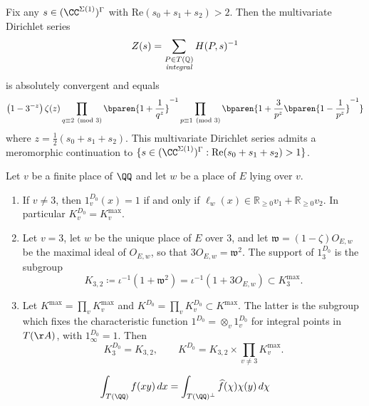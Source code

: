 \begin{theorem}\label{thm:heightZetaFunctionFormula2} Fix any $s \in (\CC^{\Sigma(1)})^{\Gamma}$ with $\mathrm{Re}(s_0+s_1+s_2) > 2$. Then the multivariate Dirichlet series \begin{equation} Z(s)= \sum_{\substack{P \in T(\mathbb Q)\\\text{\emph{integral}}}} H(P,s)^{-1} \end{equation} is absolutely convergent and equals \begin{align} \left({1-3^{-z}}\right) \zeta(z) \prod_{q\equiv2\pmod{3}} \bparen{1+\frac{1}{q^{z}}}^{-1} \prod_{p\equiv1\pmod{3}} \bparen{1+\frac{3}{p^z}\bparen{1-\frac{1}{p^z}}^{-1}} \end{align} where $z = \frac{1}{2}(s_0+s_1+s_2)$. This multivariate Dirichlet series admits a meromorphic continuation to $\{s \in (\CC^{\Sigma(1)})^{\Gamma} : \mathrm{Re}(s_0+s_1+s_2) > 1\}$. \end{theorem}

\begin{proposition}\label{prop:localIntegrality} Let $v$ be a finite place of $\QQ$ and let $w$ be a place of $E$ lying over $v$. \begin{enumerate} \item If $v \neq 3$, then $1_v^{D_0}(x) = 1$ if and only if $\ell_w(x) \in \mathbb R_{\geq 0}v_1+\mathbb R_{\geq 0}v_2$. In particular $K_v^{D_0}=K_v^{\mathrm{max}}$. \item Let $v = 3$, let $w$ be the unique place of $E$ over $3$, and let $\mathfrak w = (1-\zeta)O_{E,w}$ be the maximal ideal of $O_{E,w}$, so that $3O_{E,w} = \mathfrak w^2$. The support of $1_3^{D_0}$ is the subgroup \begin{equation} K_{3,2}\coloneqq\iota^{-1}(1+\mathfrak w^2) =\iota^{-1}(1+3O_{E,w})\subset K_3^{\mathrm{max}}. \end{equation} \item Let $K^{\mathrm{max}}=\prod_v K_v^{\mathrm{max}}$ and $K^{D_0}=\prod_v K_v^{D_0}\subset K^{\mathrm{max}}$. The latter is the subgroup which fixes the characteristic function $1^{D_0}=\otimes_v1_v^{D_0}$ for integral points in $T(\AA)$, with $1_\infty^{D_0}=1$. Then \[ K_3^{D_0}=K_{3,2},\qquad K^{D_0}=K_{3,2}\times\prod_{v\neq3}K_v^{\mathrm{max}}. \] \end{enumerate} \end{proposition}

\begin{equation}\label{eqn:poissonae} \int_{T(\QQ)} f(xy)\, dx = \int_{T(\QQ)^\perp} \widehat{f}(\chi) \chi(y) \,d\chi \end{equation}


